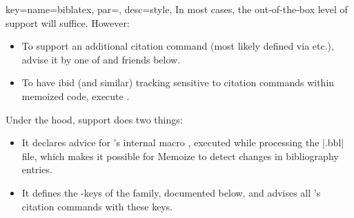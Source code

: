 \documentclass[a4paper,11pt]{article}
\begin{document}
\begin{doc}{
    key={name=biblatex, par=, desc=style},
  }
  In most cases, the out-of-the-box level of  support will
  suffice.  However:
  \begin{itemize}
  \item To support an additional citation command (most likely defined via
     etc.), advise it by one of  and
    friends below.
  \item To have ibid (and similar) tracking sensitive to citation commands
    within memoized code, execute .
  \end{itemize}

  Under the hood,  support does two things:
  \begin{itemize}
  \item It declares advice for 's internal macro
    , executed while processing the |.bbl| file, which makes
    it possible for Memoize to detect changes in bibliography entries.
  \item It defines the -keys of the  family,
    documented below, and advises all 's citation commands with
    these keys.
  \end{itemize}
\end{doc}
\end{document}
